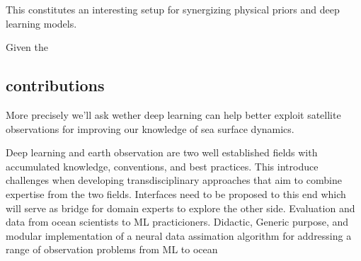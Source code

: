 \begin{bibunit}
This constitutes an interesting setup for synergizing physical priors and deep learning models.

Given the 



\subsection{contributions}
More precisely we'll ask wether deep learning can help better exploit satellite observations for improving our knowledge of sea surface dynamics.


Deep learning and earth observation are two well established fields with accumulated knowledge, conventions, and best practices. 
This introduce challenges when developing transdisciplinary approaches that aim to combine expertise from the two fields.
Interfaces need to be proposed to this end which will serve as bridge for domain experts to explore the other side.
Evaluation and data from ocean scientists to ML practicioners. 
Didactic, Generic purpose, and modular implementation of a neural data assimation algorithm for addressing a range of observation problems from ML to ocean



\end{bibunit}

